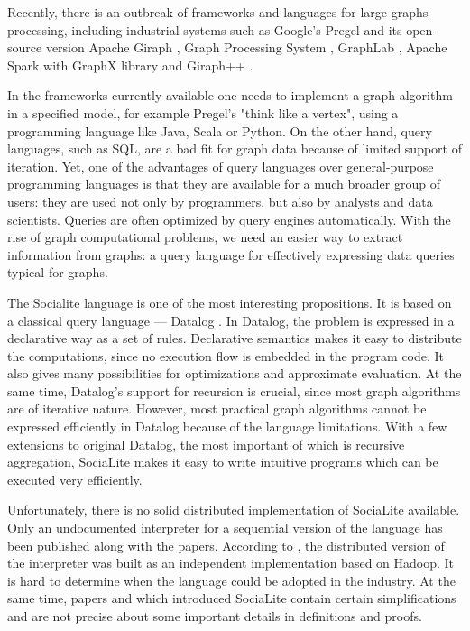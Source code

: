 Recently, there is an outbreak of frameworks and languages for large graphs processing, including industrial systems such as Google's Pregel \cite{pregel} and its open-source version Apache Giraph \cite{giraph}, Graph Processing System \cite{gps}, GraphLab \cite{graphlabwww, graphlab, graphlab2}, Apache Spark with GraphX library \cite{spark2, sparkwww} and Giraph++ \cite{giraphpp}.

In the frameworks currently available one needs to implement a graph algorithm in a specified model, for example Pregel's "think like a vertex", using a programming language like Java, Scala or Python. On the other hand, query languages, such as SQL, are a bad fit for graph data because of limited support of iteration. Yet, one of the advantages of query languages over general-purpose programming languages is that they are available for a much broader group of users: they are used not only by programmers, but also by analysts and data scientists. Queries are often optimized by query engines automatically. With the rise of graph computational problems, we need an easier way to extract information from graphs: a query language for effectively expressing data queries typical for graphs.

The Socialite \cite{socialite, distsoc} language is one of the most interesting propositions. It is based on a classical query language --- Datalog \cite{fod}. In Datalog, the problem is expressed in a declarative way as a set of rules. Declarative semantics makes it easy to distribute the computations, since no execution flow is embedded in the program code. It also gives many possibilities for optimizations and approximate evaluation. At the same time, Datalog's support for recursion is crucial, since most graph algorithms are of iterative nature. However, most practical graph algorithms cannot be expressed efficiently in Datalog because of the language limitations. With a few extensions to original Datalog, the most important of which is recursive aggregation, SociaLite makes it easy to write intuitive programs which can be executed very efficiently.

Unfortunately, there is no solid distributed implementation of SociaLite available. Only an undocumented interpreter for a sequential version of the language has been published along with the papers. According to \cite{distsoc}, the distributed version of the interpreter was built as an independent implementation based on Hadoop. It is hard to determine when the language could be adopted in the industry. At the same time, papers \cite{socialite} and \cite{distsoc} which introduced SociaLite contain certain simplifications and are not precise about some important details in definitions and proofs.

